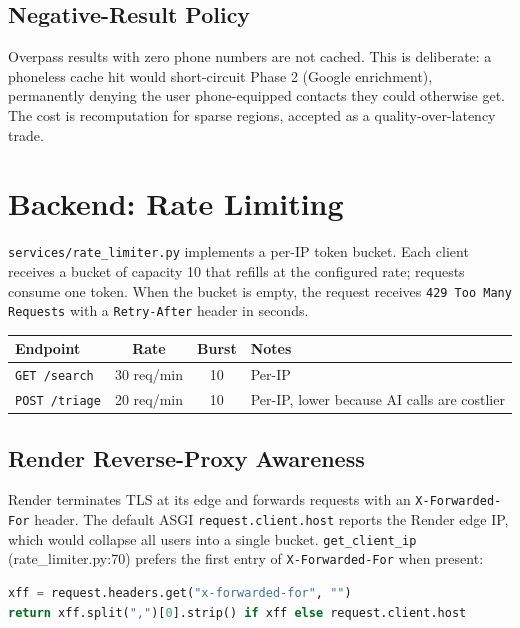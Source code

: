 \documentclass[11pt, a4paper]{article}
\newcommand{\file}[1]{\texttt{\small\color{rsblue}#1}}
\newcommand{\code}[1]{\texttt{\small#1}}
\begin{document}
\subsection{Negative-Result Policy}

Overpass results with zero phone numbers are not cached. This is deliberate: a phoneless cache hit would short-circuit Phase 2 (Google enrichment), permanently denying the user phone-equipped contacts they could otherwise get. The cost is recomputation for sparse regions, accepted as a quality-over-latency trade.

\section{Backend: Rate Limiting}

\file{services/rate\_limiter.py} implements a per-IP token bucket. Each client receives a bucket of capacity 10 that refills at the configured rate; requests consume one token. When the bucket is empty, the request receives \code{429 Too Many Requests} with a \code{Retry-After} header in seconds.

\begin{tabularx}{\textwidth}{l c c X}
\toprule
\textbf{Endpoint} & \textbf{Rate} & \textbf{Burst} & \textbf{Notes} \\
\midrule
\code{GET /search} & 30 req/min & 10 & Per-IP \\
\code{POST /triage} & 20 req/min & 10 & Per-IP, lower because AI calls are costlier \\
\bottomrule
\end{tabularx}

\subsection{Render Reverse-Proxy Awareness}

Render terminates TLS at its edge and forwards requests with an \code{X-Forwarded-For} header. The default ASGI \code{request.client.host} reports the Render edge IP, which would collapse all users into a single bucket. \code{get\_client\_ip} (rate\_limiter.py:70) prefers the first entry of \code{X-Forwarded-For} when present:

\begin{lstlisting}[language=Python,numbers=none,frame=none]
xff = request.headers.get("x-forwarded-for", "")
return xff.split(",")[0].strip() if xff else request.client.host
\end{lstlisting}
\end{document}
